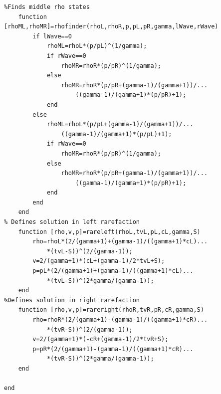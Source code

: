 \begin{lstlisting}
%Finds middle rho states
    function [rhoML,rhoMR]=rhofinder(rhoL,rhoR,p,pL,pR,gamma,lWave,rWave)
        if lWave==0
            rhoML=rhoL*(p/pL)^(1/gamma);
            if rWave==0
                rhoMR=rhoR*(p/pR)^(1/gamma);
            else
                rhoMR=rhoR*(p/pR+(gamma-1)/(gamma+1))/...
                    ((gamma-1)/(gamma+1)*(p/pR)+1);
            end
        else
            rhoML=rhoL*(p/pL+(gamma-1)/(gamma+1))/...
                ((gamma-1)/(gamma+1)*(p/pL)+1);
            if rWave==0
                rhoMR=rhoR*(p/pR)^(1/gamma);
            else
                rhoMR=rhoR*(p/pR+(gamma-1)/(gamma+1))/...
                    ((gamma-1)/(gamma+1)*(p/pR)+1);
            end
        end
    end
% Defines solution in left rarefaction
    function [rho,v,p]=rareleft(rhoL,tvL,pL,cL,gamma,S)
        rho=rhoL*(2/(gamma+1)+(gamma-1)/((gamma+1)*cL)...
            *(tvL-S))^(2/(gamma-1));
        v=2/(gamma+1)*(cL+(gamma-1)/2*tvL+S);
        p=pL*(2/(gamma+1)+(gamma-1)/((gamma+1)*cL)...
            *(tvL-S))^(2*gamma/(gamma-1));
    end
%Defines solution in right rarefaction
    function [rho,v,p]=rareright(rhoR,tvR,pR,cR,gamma,S)
        rho=rhoR*(2/(gamma+1)-(gamma-1)/((gamma+1)*cR)...
            *(tvR-S))^(2/(gamma-1));
        v=2/(gamma+1)*(-cR+(gamma-1)/2*tvR+S);
        p=pR*(2/(gamma+1)-(gamma-1)/((gamma+1)*cR)...
            *(tvR-S))^(2*gamma/(gamma-1));
    end

end
\end{lstlisting}

